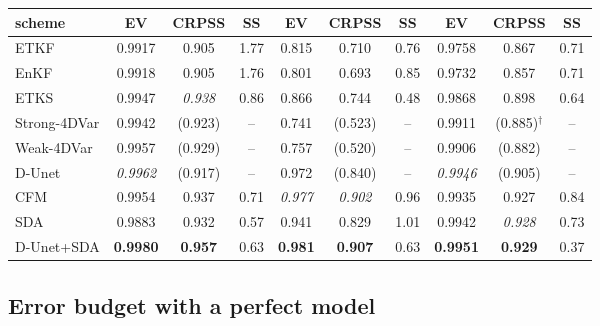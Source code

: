 \begin{table}[t]
\begin{tabular}{lccccccccc}
\cmidrule(lr){2-4}\cmidrule(lr){5-7}\cmidrule(lr){8-10}
scheme & EV & CRPSS & SS & EV & CRPSS & SS & EV & CRPSS & SS \\
\midrule
ETKF            & 0.9917 & 0.905 & 1.77 & 0.815 & 0.710 & 0.76 & 0.9758 & 0.867 & 0.71 \\
EnKF            & 0.9918 & 0.905 & 1.76 & 0.801 & 0.693 & 0.85 & 0.9732 & 0.857 & 0.71 \\
ETKS            & 0.9947 & \textit{0.938} & 0.86 & 0.866 & 0.744 & 0.48 & 0.9868 & 0.898 & 0.64 \\
Strong-4DVar    & 0.9942 & (0.923) & -- & 0.741 & (0.523) & -- & 0.9911 & (0.885)$^\dagger$ & -- \\
Weak-4DVar      & 0.9957 & (0.929) & -- & 0.757 & (0.520) & -- & 0.9906 & (0.882) & -- \\
\midrule
D-Unet      & \textit{0.9962} & (0.917) & -- & 0.972 & (0.840) & -- & \textit{0.9946} & (0.905) & -- \\
CFM             & 0.9954 & 0.937 & 0.71 & \textit{0.977} & \textit{0.902} & 0.96 & 0.9935 & 0.927 & 0.84 \\
SDA             & 0.9883 & 0.932 & 0.57 & 0.941 & 0.829 & 1.01 & 0.9942 & \textit{0.928} & 0.73 \\
D-Unet+SDA      & \textbf{0.9980} & \textbf{0.957} & 0.63 & \textbf{0.981} & \textbf{0.907} & 0.63 & \textbf{0.9951} & \textbf{0.929} & 0.37 \\
\bottomrule
\end{tabular}
\end{table}

\subsection{Error budget with a perfect model}\label{sec:q1}\label{sec:q1-budget}
